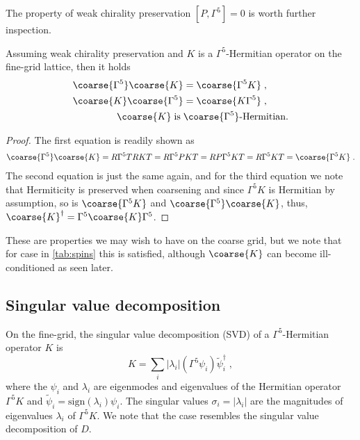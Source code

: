 The property of weak chirality preservation $[P, \Gamma^{5}]=0$ is worth further inspection.

\begin{lemma} \label{lemma:chirality:preservation:implications}
Assuming weak chirality preservation and $K$ is a $\Gamma^{5}$-Hermitian operator on the fine-grid lattice, then it holds
\begin{align}
\coarse{\Gamma^{5}} \coarse{K} &= \coarse{\Gamma^{5} K} \;, \\
\coarse{K} \coarse{\Gamma^{5}} &= \coarse{K \Gamma^{5}} \;, \\
\coarse{K} \; \text{is} \; &\coarse{\Gamma^{5}} \text{-Hermitian.}
\end{align}
\end{lemma}

\begin{proof}
The first equation is readily shown as
\begin{align}
\coarse{\Gamma^{5}} \coarse{K} = R \Gamma^{5} T R K T = R \Gamma^{5} P K T = R P \Gamma^{5} K T = R \Gamma^{5} K T = \coarse{\Gamma^{5} K} \;.
\end{align}
The second equation is just the same again, and for the third equation we note that Hermiticity is preserved when coarsening and since $\Gamma^{5} K$ is Hermitian by assumption, so is $\coarse{\Gamma^{5} K}$ and $\coarse{\Gamma^{5}} \coarse{K}$, thus, $\coarse{K}^{\dagger} = \Gamma^{5} \coarse{K} \Gamma^{5}$.
\end{proof}

These are properties we may wish to have on the coarse grid, but we note that for case  in \cref{tab:spins} this is satisfied, although $\coarse{K}$ can become ill-conditioned as seen later.

\subsection{Singular value decomposition}

On the fine-grid, the singular value decomposition (SVD) of a $\Gamma^{5}$-Hermitian operator $K$ is
\begin{equation} \label{eq:svd}
K = \sum_{i} \lvert \lambda_i \rvert (\Gamma^{5} \psi_i) \tilde{\psi}_i^{\dagger} \;,
\end{equation}
where the $\psi_i$ and $\lambda_i$ are eigenmodes and eigenvalues of the Hermitian operator $\Gamma^{5} K$ and $\tilde{\psi}_i = \text{sign}(\lambda_i) \psi_i$.
The singular values $\sigma_i = \lvert \lambda_i \rvert$ are the magnitudes of eigenvalues $\lambda_i$ of $\Gamma^{5} K$.
We note that the case  resembles the singular value decomposition of $D$.

